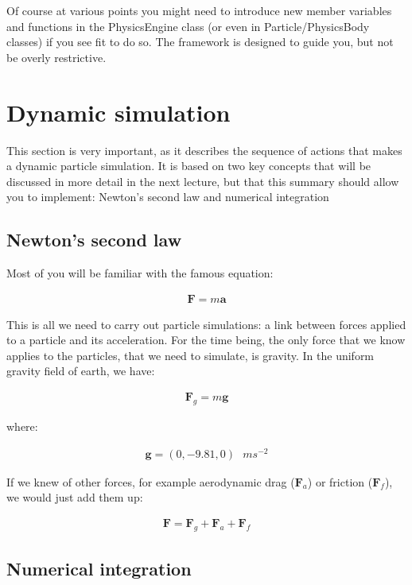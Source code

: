 \documentclass[12pt]{article}
\begin{document}
Of course at various points you might need to introduce new member variables and functions in the PhysicsEngine class (or even in Particle/PhysicsBody classes) if you see fit to do so. The framework is designed to guide you, but not be overly restrictive.


\section*{Dynamic simulation}

This section is very important, as it describes the sequence of actions that makes a dynamic particle simulation. It is based on two key concepts that will be discussed in more detail in the next lecture, but that this summary should allow you to implement: Newton's second law and numerical integration

\subsection*{Newton's second law}

Most of you will be familiar with the famous equation:

\begin{align}
\bm{F} = m\bm{a}
\end{align}

This is all we need to carry out particle simulations: a link between forces applied to a particle and its acceleration. For the time being, the only force that we know applies to the particles, that we need to simulate, is gravity. In the uniform gravity field of earth, we have:

\begin{align}
\bm{F}_g = m\bm{g}
\end{align}

where:

\begin{align}
\bm{g} = (0,-9.81,0) \text{ } ms^{-2}
\end{align}

If we knew of other forces, for example aerodynamic drag ($\bm{F}_a$) or friction ($\bm{F}_f$), we would just add them up:

\begin{align}
\bm{F}=\bm{F}_g+\bm{F}_a+\bm{F}_f
\end{align}

\subsection*{Numerical integration}
\end{document}
